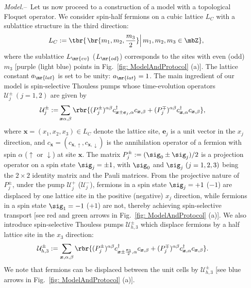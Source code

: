 \documentclass[
floatfix,
pra,
twocolumn,
reprint,
amsmath,amssymb,
aps,
footnote,
]{revtex4}
\begin{document}
\textit{Model.}--\
Let us now proceed to a construction of a model with a topological Floquet operator.
We consider spin-half fermions on a cubic lattice $L_C$ with a sublattice structure in the third direction:
\begin{align}
	L_C := \tbr{\left. \br{m_1, m_2, {m_3 \over 2}}\right| m_1, m_2, m_3 \in \mbZ }
	,
\end{align}
where the sublattice $L_{\mr{ev}}$ ($L_{\mr{od}}$) corresponds to the sites with even (odd) $m_3$ [purple (light blue) points in Fig.~\ref{fig: ModelAndProtocol} (a)].
The lattice constant $a_{\mr{lat}}$ is set to be unity: $a_{\mr{lat}} = 1$.
The main ingredient of our model is spin-selective Thouless pumps \cite{Kitagawa10, Thouless83, Budich17} whose time-evolution operators $\mathcal{U}_j^\pm \ (j= 1,2)$ are given by
\begin{align}
	\mathcal{U}_j^\pm :=& \sum_{\bm{x} \alpha,\beta}
\rbr{
(P_j^\pm)^{\alpha\beta} c_{\bm{x} \pm \bm{e}_j, \alpha}^\dagger c_{\bm{x}, \beta}
 + (P_j^\mp)^{\alpha\beta} c_{\bm{x}, \alpha}^\dagger c_{\bm{x}, \beta}
}
	, \label{eq: in-plane pump}
\end{align}
where $\bm{x} = (x_1, x_2, x_3) \in L_C$ denote the lattice site, $\bm{e}_j$ is a unit vector in the $x_j$ direction, and
$c_{\bm{x}} = (c_{\bm{x}, \uparrow}, c_{\bm{x}, \downarrow})$ is the annihilation operator of a fermion with spin $\alpha$ ($\uparrow$ or $\downarrow$) at site $\bm{x}$.
The matrix $P_j^\pm := (\sig_0 \pm \sig_j)/2$ is a projection operator on a spin state $\sig_j = \pm 1$, with $\sig_0$ and $\sig_j \ (j=1,2,3)$ being the $2 \times 2$ identity matrix and the Pauli matrices.
From the projective nature of $P_j^\pm$, under the pump $\mathcal{U}_j^+$ ($\mathcal{U}_j^-$),
fermions in a spin state $\sig_j = +1$ ($-1$) are displaced by one lattice site in the positive (negative) $x_j$ direction, while fermions in a spin state $\sig_1 = -1$ ($+1$) are not, thereby achieving spin-selective transport [see red and green arrows in Fig.~\ref{fig: ModelAndProtocol} (a)].
We also introduce spin-selective Thouless pumps $\mathcal{U}_{h,3}^\pm$ which displace fermions by a half lattice site in the $x_3$ direction:
\begin{align}
	\mathcal{U}_{h,3}^\pm &:=
	\sum_{\bm{x}, \alpha,\beta}
	\rbr{
(P_j^\pm)^{\alpha\beta} c_{\bm{x} \pm {\bm{e}_3 \over 2}, \alpha}^\dagger c_{\bm{x}, \beta}
 + (P_j^\mp)^{\alpha\beta} c_{\bm{x}, \alpha}^\dagger c_{\bm{x}, \beta}
	}
	. \label{eq: in-axis pump}
\end{align}
We note that fermions can be displaced between the unit cells by $\mathcal{U}_{h,3}^\pm$ [see blue arrows in Fig.~\ref{fig: ModelAndProtocol} (a)].
\end{document}
